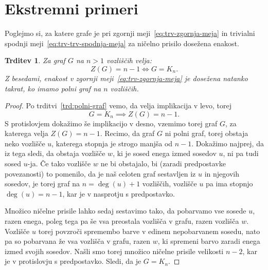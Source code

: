 \documentclass[12pt,a4paper,twoside]{article}
\theoremstyle{definition} %
\theoremstyle{plain} %
\newtheorem{trditev}[definicija]{Trditev}
\numberwithin{equation}{section}  %
\begin{document}
\section{Ekstremni primeri}
Poglejmo si, za katere grafe je pri zgornji meji~\eqref{eq:trv-zgornja-meja} in trivialni spodnji meji~\eqref{eq:trv-trv-spodnja-meja} za ničelno prisilo dosežena enakost.
\begin{trditev}{{\cite[trditev 2.2]{row2012technique}}}
    Za graf $G$ na $n > 1$ vozliščih velja:
    \[ Z(G) = n - 1 \iff G = K_n .\]
    Z besedami, enakost v zgornji meji~\eqref{eq:trv-zgornja-meja} je dosežena natanko takrat, ko imamo polni graf na $n$ vozliščih.
\end{trditev}
\begin{proof}
    Po trditvi~\ref{trd:polni-graf} vemo, da velja implikacija v levo, torej
    \[ G = K_n \implies Z(G) = n-1. \]
    S protislovjem dokažimo še implikacijo v desno, vzemimo torej graf $G$, za katerega velja $Z(G) = n-1$. Recimo, da graf $G$ ni polni graf, torej obstaja neko vozlišče $u$, katerega stopnja je strogo manjša od $n-1$. 
    Dokažimo najprej, da iz tega sledi, da obstaja vozlišče $w$, ki je sosed enega izmed sosedov $u$, ni pa tudi sosed $u$-ja. Če tako vozlišče $w$ ne bi obstajalo, bi (zaradi predpostavke povezanosti) to pomenilo, da je naš celoten graf sestavljen iz $u$ in njegovih sosedov, je torej graf na $n = \deg(u) + 1$ vozliščih, vozlišče $u$ pa ima stopnjo $\deg(u) = n-1$, kar je v nasprotju s predpostavko.
    
    Množico ničelne prisile lahko sedaj sestavimo tako, da pobarvamo vse sosede $u$, razen enega, poleg tega pa še vsa preostala vozlišča v grafu, razen vozlišča $w$. Vozlišče $u$ torej povzroči spremembo barve v edinem nepobarvanem sosedu, nato pa so pobarvana že vsa vozlišča v grafu, razen $w$, ki spremeni barvo zaradi enega izmed svojih sosedov. Našli smo torej množico ničelne prisile velikosti $n-2$, kar je v protislovju s predpostavko. Sledi, da je $G = K_n$. 
\end{proof}
\end{document}
